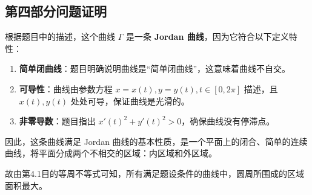 \documentclass[12pt]{ctexart}
\begin{document}
\subsection{第四部分问题证明}
根据题目中的描述，这个曲线 $\Gamma$ 是一条 \textbf{Jordan 曲线}，因为它符合以下定义特性：
\begin{enumerate}
    \item \textbf{简单闭曲线}：题目明确说明曲线是“简单闭曲线”，这意味着曲线不自交。
    \item \textbf{可导性}：曲线由参数方程 $x = x(t), y = y(t), t \in [0, 2\pi]$ 描述，且 $x(t), y(t)$ 处处可导，保证曲线是光滑的。
    \item \textbf{非零导数}：题目指出 $x'(t)^2 + y'(t)^2 > 0$，确保曲线没有停滞点。
\end{enumerate}

因此，这条曲线满足 Jordan 曲线的基本性质，是一个平面上的闭合、简单的连续曲线，将平面分成两个不相交的区域：内区域和外区域。

故由第4.1目的等周不等式可知，所有满足题设条件的曲线中，圆周所围成的区域面积最大。

\newpage 
\printbibliography %
\end{document}
